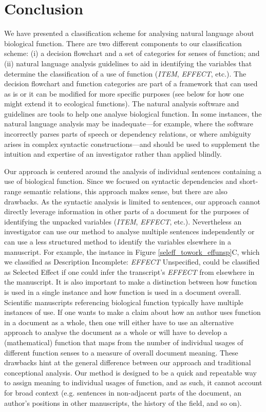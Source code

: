 \documentclass{article}
\begin{document}
\section{Conclusion}
\label{sec:conclusion}

We have presented a classification scheme for analysing natural language about biological function.
There are two different components to our classification scheme: (i) a decision flowchart and a set of categories for senses of function; and (ii) natural language analysis guidelines to aid in identifying the variables that determine the classification of a use of function (\emph{ITEM}, \emph{EFFECT}, etc.).
The decision flowchart and function categories are part of a framework that can used as is or it can be modified for more specific purposes (see below for how one might extend it to ecological functions).
The natural analysis software and guidelines are tools to help one analyse biological function.
In some instances, the natural language analysis may be inadequate---for example, where the software incorrectly parses parts of speech or dependency relations, or where ambiguity arises in complex syntactic constructions---and should be used to supplement the intuition and expertise of an investigator rather than applied blindly.

Our approach is centered around the analysis of individual sentences containing a use of biological function.
Since we focused on syntactic dependencies and short-range semantic relations, this approach makes sense, but there are also drawbacks.
As the syntactic analysis is limited to sentences, our approach cannot directly leverage information in other parts of a document for the purposes of identifying the unpacked variables (\emph{ITEM}, \emph{EFFECT}, etc.).
Nevertheless an investigator can use our method to analyse multiple sentences independently or can use a less structured method to identify the variables elsewhere in a manuscript.
For example, the instance in Figure \ref{seleff_towork_effunsp}C, which we classified as Description Incomplete: \emph{EFFECT} Unspecified, could be classified as Selected Effect if one could infer the transcript's \emph{EFFECT} from elsewhere in the manuscript.
It is also important to make a distinction between how function is used in a single instance and how function is used in a document overall.
Scientific manuscripts referencing biological function typically have multiple instances of use.
If one wants to make a claim about how an author uses function in a document as a whole, then one will either have to use an alternative approach to analyse the document as a whole or will have to develop a (mathematical) function that maps from the number of individual usages of different function senses to a measure of overall document meaning.
These drawbacks hint at the general difference between our approach and traditional conceptional analysis.
Our method is designed to be a quick and repeatable way to assign meaning to individual usages of function, and as such, it cannot account for broad context (e.g. sentences in non-adjacent parts of the document, an author's positions in other manuscripts, the history of the field, and so on).
\end{document}

